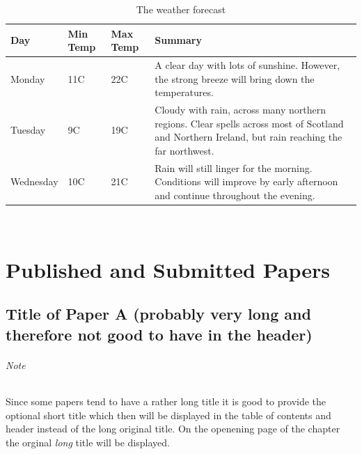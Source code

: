\documentclass[11pt,openright]{book} %
\begin{document}
\lipsum[4]

\begin{table}[!ht]
 \caption{The weather forecast}
  \centering
   \begin{tabular}{ | l | l | l | p{5cm} |}
    \hline
    Day & Min Temp & Max Temp & Summary \\ \hline
    Monday & 11C & 22C & A clear day with lots of sunshine.
    However, the strong breeze will bring down the temperatures. \\ \hline
    Tuesday & 9C & 19C & Cloudy with rain, across many northern regions. Clear spells
    across most of Scotland and Northern Ireland,
    but rain reaching the far northwest. \\ \hline
    Wednesday & 10C & 21C & Rain will still linger for the morning.
    Conditions will improve by early afternoon and continue
    throughout the evening. \\
    \hline
    \end{tabular}
\end{table}

~\nocite{*}

\cleardoublepage

\printbibliography[heading=bibintoc]


\appendix
\renewcommand{\appendixname}{Paper} %

\part{Published and Submitted Papers}  %
\label{part:papers}


\chapter[Short Title of Paper A]{Title of Paper A (probably very long and therefore not good to have in the header)}
\label{paper-a}

\paragraph{Note}
Since some papers tend to have a rather long title it is good to provide the optional short title which then will be displayed in the table of contents and header instead of the long original title.
On the openening page of the chapter the orginal \emph{long} title will be displayed.\bigskip
\end{document}
